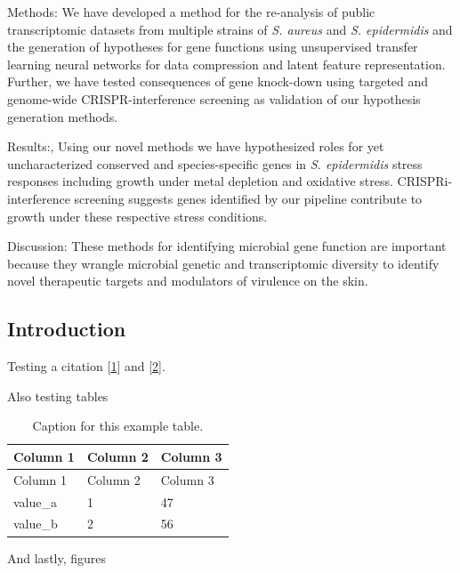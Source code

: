 Methods: We have developed a method for the re-analysis of public transcriptomic datasets from multiple strains of \emph{S. aureus} and \emph{S. epidermidis} and the generation of hypotheses for gene functions using unsupervised transfer learning neural networks for data compression and latent feature representation. Further, we have tested consequences of gene knock-down using targeted and genome-wide CRISPR-interference screening as validation of our hypothesis generation methods.

Results:, Using our novel methods we have hypothesized roles for yet uncharacterized conserved and species-specific genes in \emph{S. epidermidis} stress responses including growth under metal depletion and oxidative stress. CRISPRi-interference screening suggests genes identified by our pipeline contribute to growth under these respective stress conditions.

Discussion: These methods for identifying microbial gene function are important because they wrangle microbial genetic and transcriptomic diversity to identify novel therapeutic targets and modulators of virulence on the skin.

\hypertarget{introduction}{%
\subsection{Introduction}\label{introduction}}

Testing a citation {[}\protect\hyperlink{ref-754TZ3KR}{1}{]} and {[}\protect\hyperlink{ref-f98SpRHX}{2}{]}.

Also testing tables

\begin{longtable}[]{@{}lll@{}}
\caption{Caption for this example table. \label{tbl:example-id}}\label{tbl:example-id}\tabularnewline
\toprule()
Column 1 & Column 2 & Column 3 \\
\midrule()
\endfirsthead
\toprule()
Column 1 & Column 2 & Column 3 \\
\midrule()
\endhead
value\_a & 1 & 47 \\
value\_b & 2 & 56 \\
\bottomrule()
\end{longtable}

And lastly, figures


